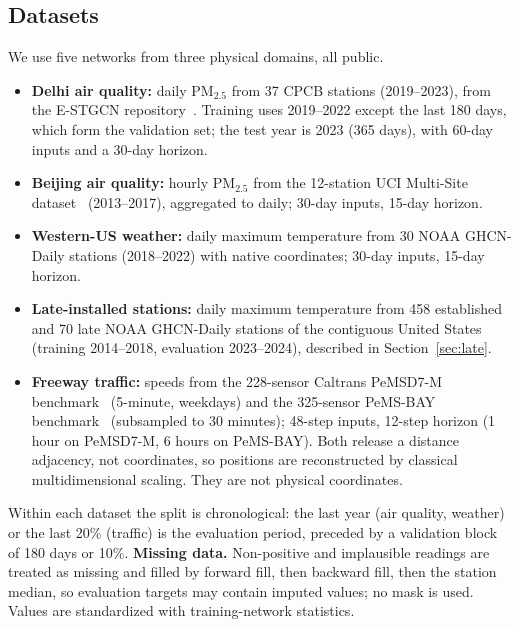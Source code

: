 \documentclass[journal,twoside,web]{ieeecolor}
\begin{document}
\subsection{Datasets}
We use five networks from three physical domains, all public.
\begin{itemize}
\item \textbf{Delhi air quality:} daily PM$_{2.5}$ from 37 CPCB stations (2019--2023), from the
E-STGCN repository~\cite{panja2026estgcn}. Training uses 2019--2022 except the last 180 days, which
form the validation set; the test year is 2023 (365 days), with 60-day inputs and a 30-day horizon.
\item \textbf{Beijing air quality:} hourly PM$_{2.5}$ from the 12-station UCI Multi-Site
dataset~\cite{zhang2017beijingair} (2013--2017), aggregated to daily; 30-day inputs, 15-day horizon.
\item \textbf{Western-US weather:} daily maximum temperature from 30 NOAA GHCN-Daily stations
(2018--2022) with native coordinates; 30-day inputs, 15-day horizon.
\item \textbf{Late-installed stations:} daily maximum temperature from 458 established and 70 late NOAA GHCN-Daily
stations of the contiguous United States (training 2014--2018, evaluation 2023--2024), described in
Section~\ref{sec:late}.
\item \textbf{Freeway traffic:} speeds from the 228-sensor Caltrans PeMSD7-M
benchmark~\cite{yu2018stgcn} (5-minute, weekdays) and the 325-sensor PeMS-BAY benchmark~\cite{li2018dcrnn}
(subsampled to 30 minutes); 48-step inputs, 12-step horizon (1 hour on PeMSD7-M, 6 hours on PeMS-BAY). Both release a distance adjacency, not coordinates, so positions are reconstructed by
classical multidimensional scaling. They are not physical coordinates.
\end{itemize}
Within each dataset the split is chronological: the last year (air quality, weather) or the last 20\%
(traffic) is the evaluation period, preceded by a validation block of 180 days or 10\%.
\textbf{Missing data.} Non-positive and implausible readings are treated as missing and filled by forward fill,
then backward fill, then the station median, so evaluation targets may contain imputed values; no mask is used.
Values are standardized with training-network statistics.
\end{document}
